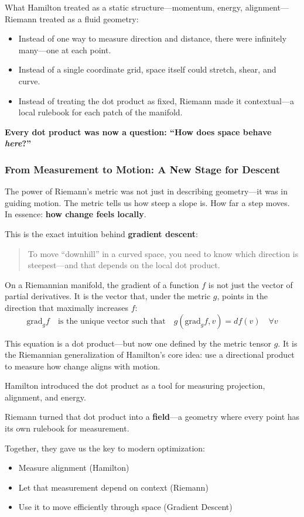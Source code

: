 What Hamilton treated as a static structure—momentum, energy, alignment—Riemann treated as a fluid geometry:

\begin{itemize}
  \item Instead of one way to measure direction and distance, there were infinitely many—one at each point.
  \item Instead of a single coordinate grid, space itself could stretch, shear, and curve.
  \item Instead of treating the dot product as fixed, Riemann made it contextual—a local rulebook for each patch of the manifold.
\end{itemize}

\textbf{Every dot product was now a question: “How does space behave \textit{here}?”}

\subsubsection*{From Measurement to Motion: A New Stage for Descent}

The power of Riemann’s metric was not just in describing geometry—it was in guiding motion.  
The metric tells us how steep a slope is. How far a step moves.  
In essence: \textbf{how change feels locally}.

This is the exact intuition behind \textbf{gradient descent}:

\begin{quote}
To move “downhill” in a curved space, you need to know which direction is steepest—and that depends on the local dot product.
\end{quote}

On a Riemannian manifold, the gradient of a function \( f \) is not just the vector of partial derivatives. It is the vector that, under the metric \( g \), points in the direction that maximally increases \( f \):
\[
\text{grad}_g f \quad \text{is the unique vector such that} \quad g(\text{grad}_g f, v) = df(v) \quad \forall v
\]

This equation is a dot product—but now one defined by the metric tensor \( g \). It is the Riemannian generalization of Hamilton’s core idea: use a directional product to measure how change aligns with motion.

\begin{tcolorbox}[colback=blue!5!white, colframe=blue!50!black,
title={Sidebar: Hamilton’s Dot Product Grows Up}]
Hamilton introduced the dot product as a tool for measuring projection, alignment, and energy.

Riemann turned that dot product into a \textbf{field}—a geometry where every point has its own rulebook for measurement.

Together, they gave us the key to modern optimization:
\begin{itemize}
  \item Measure alignment (Hamilton)
  \item Let that measurement depend on context (Riemann)
  \item Use it to move efficiently through space (Gradient Descent)
\end{itemize}
\end{tcolorbox}

